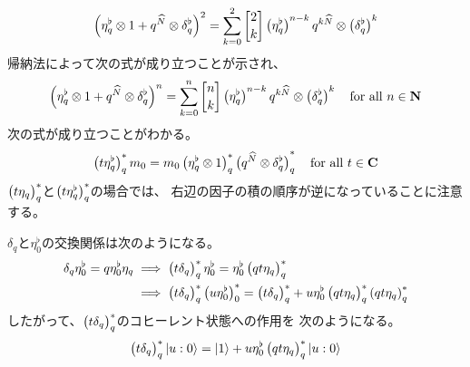 {\begin{note}[q-Kleeneスターの余積]
\begin{equation*}
\begin{split}
			\plr{\eta_q^\flat\otimes1 + q^{\Nhat}\otimes\delta_q^\flat}^2
			= \sum_{k=0}^2 \qbinom{2}{k} \gplr{\eta_q^\flat}^{n-k}q^{k\Nhat}
				\otimes\gplr{\delta_q^\flat}^k
		\end{split}\end{equation*}
		帰納法によって次の式が成り立つことが示され、
		\begin{equation*}\begin{split}
			\plr{\eta_q^\flat\otimes1 + q^{\Nhat}\otimes\delta_q^\flat}^n
			= \sum_{k=0}^n \qbinom{n}{k} \gplr{\eta_q^\flat}^{n-k}q^{k\Nhat}
				\otimes\gplr{\delta_q^\flat}^k \quad\text{for all } n\in\sizen
		\end{split}\end{equation*}
		次の式が成り立つことがわかる。
		\begin{equation*}\begin{split}
			\mathinner{\bigl({t\eta_q^\flat}\bigr)}_q^*m_0 = m_0 \mathinner{\bigl({\eta_q^\flat\otimes1}\bigr)}_q^*
				\mathinner{\bigl({q^{{\widehat{N}}}\otimes\delta_q^\flat}\bigr)}_q^*
				\quad\text{for all } t\in\mathbf{C}
		\end{split}\end{equation*}
		$\mathinner{\bigl({t\eta_q}\bigr)}_q^*$と$\mathinner{\bigl({t\eta_q^\flat}\bigr)}_q^*$の場合では、
		右辺の因子の積の順序が逆になっていることに注意する。
	\end{note} %

	\begin{note}\label{note:delta_qの交換関係} %
		$\delta_q$と$\eta_0^\flat$の交換関係は次のようになる。
		\begin{equation*}\begin{split}
			\delta_q\eta_0^\flat = q\eta_0^\flat\eta_q 
			&\implies \mathinner{\bigl({t\delta_q}\bigr)}_q^*\eta_0^\flat 
				= \eta_0^\flat\mathinner{\bigl({qt\eta_q}\bigr)}_q^* \\
			&\implies \mathinner{\bigl({t\delta_q}\bigr)}_q^*\mathinner{\bigl({u\eta_0^\flat}\bigr)}_0^*
				= \mathinner{\bigl({t\delta_q}\bigr)}_q^* 
				+ u\eta_0^\flat\mathinner{\bigl({qt\eta_q}\bigr)}_q^*\mathinner{\left({qt\eta_q}\right)}_q^*
		\end{split}\end{equation*}
		したがって、$\mathinner{\bigl({t\delta_q}\bigr)}_q^*$のコヒーレント状態への作用を
		次のようになる。
		\begin{equation*}\begin{split}
			\mathinner{\bigl({t\delta_q}\bigr)}_q^*\mathinner{|{u:0}\rangle} = \mathinner{|{1}\rangle} 
			+ u\eta_0^\flat\mathinner{\bigl({qt\eta_q}\bigr)}_q^*\mathinner{|{u:0}\rangle}
		\end{split}\end{equation*}
	\end{note} %

}
